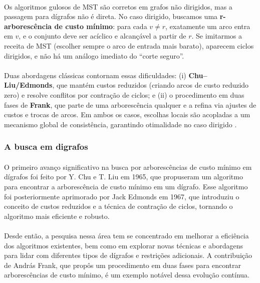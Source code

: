 \documentclass[12pt,a4paper]{article}
\def\emph#1{#1}%
\begin{document}
\paragraph{}
Os algoritmos gulosos de MST são corretos em grafos não dirigidos, mas a passagem para dígrafos \emph{não} é direta. No caso dirigido, buscamos uma \textbf{r-arborescência de custo mínimo}: para cada \(v\neq r\), exatamente um arco entra em \(v\), e o conjunto deve ser acíclico e alcançável a partir de \(r\). Se imitarmos a receita de MST (escolher sempre o arco de entrada mais barato), aparecem \emph{ciclos dirigidos}, e não há um análogo imediato do “corte seguro”.

\paragraph{}
Duas abordagens clássicas contornam essas dificuldades: (i) \textbf{Chu–Liu/Edmonds}, que mantém \emph{custos reduzidos} (criando arcos de custo reduzido zero) e resolve conflitos por \emph{contração de ciclos}; e (ii) o procedimento em duas fases de \textbf{Frank}, que parte de uma arborescência qualquer e a refina via ajustes de custos e trocas de arcos. Em ambos os casos, escolhas locais são acopladas a um mecanismo global de consistência, garantindo otimalidade no caso dirigido \cite{schrijver2003comb}.

\subsubsection{A busca em digrafos}

\paragraph{}
O primeiro avanço significativo na busca por arborescências de custo mínimo em dígrafos foi feito por Y. Chu e T. Liu em 1965, que propuseram um algoritmo para encontrar a arborescência de custo mínimo em um dígrafo. Esse algoritmo foi posteriormente aprimorado por Jack Edmonds em 1967, que introduziu o conceito de custos reduzidos e a técnica de contração de ciclos, tornando o algoritmo mais eficiente e robusto.

\paragraph{}
Desde então, a pesquisa nessa área tem se concentrado em melhorar a eficiência dos algoritmos existentes, bem como em explorar novas técnicas e abordagens para lidar com diferentes tipos de dígrafos e restrições adicionais. A contribuição de András Frank, que propôs um procedimento em duas fases para encontrar arborescências de custo mínimo, é um exemplo notável dessa evolução contínua.
\end{document}
